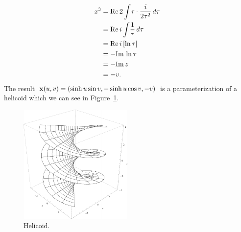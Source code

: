 \begin{ex}
    \begin{align*}
      x^3 &= \text{Re}\,2\int\!\tau\cdot\frac{i}{2\tau^2}\,d\tau\\
      &= \text{Re}\, i\int\!\frac{1}{\tau}\,d\tau\\
      &= \text{Re}\, i \left[\ln\tau\right]\\
      &= -\text{Im}\,\ln\tau\\
      &= -\text{Im}\, z\\
      &= -v.
    \end{align*}
    The result $\mathbf{x}(u, v) = (\sinh u \sin v, -\sinh u \cos v, -v)$ is a parameterization of a helicoid which we can see in Figure~\ref{fig:helicoid}.
    \begin{figure} %
      \centering
      \includegraphics[width=0.5\textwidth]{figures/helicoid.pdf}
      \caption{Helicoid.}
      \label{fig:helicoid}
    \end{figure}
  \end{ex}

